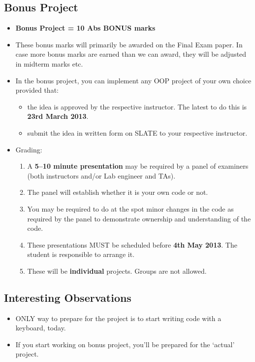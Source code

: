 \documentclass[12pt,a4paper]{article}
\begin{document}
\subsection{Bonus Project}
\begin{itemize}
\item \textbf{Bonus Project = 10 Abs BONUS marks}
\item These bonus marks will primarily be awarded on the Final Exam paper. In case more bonus marks are earned than we can award, they will be adjusted in midterm marks etc.
\item In the bonus project, you can implement any OOP project of your own choice provided that:
\begin{itemize}
\item the idea is approved by the respective instructor. The latest to do this is \textbf{23rd March 2013}.
\item submit the idea in written form on SLATE to your respective instructor.
\end{itemize}
\item Grading:
\begin{enumerate}
\item A \textbf{5--10 minute presentation} may be required by a panel of examiners (both instructors and/or Lab engineer and TAs).
\item The panel will establish whether it is your own code or not.
\item You may be required to do at the spot minor changes in the code as required by the panel to demonstrate ownership and understanding of the code.
\item These presentations MUST be scheduled before \textbf{4th May 2013}. The student is responsible to arrange it.
\item These will be \textbf{individual} projects. Groups are not allowed.
\end{enumerate}
\end{itemize}
\subsection{Interesting Observations}
\begin{itemize}
\item ONLY way to prepare for the project is to start writing code with a keyboard, today.
\item If you start working on bonus project, you'll be prepared for the `actual' project.
\end{itemize}
\newpage
\end{document}
